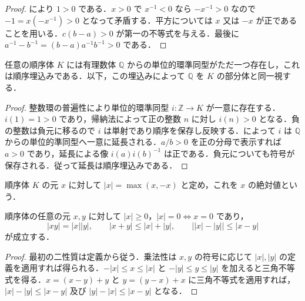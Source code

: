 \begin{proof}
により $1>0$ である．$x>0$ で $x^{-1}<0$ なら $-x^{-1}>0$ なので $-1=x(-x^{-1})>0$ となって矛盾する．平方については $x$ 又は $-x$ が正であることを用いる．$c(b-a)>0$ が第一の不等式を与える．最後に $a^{-1}-b^{-1}=(b-a)a^{-1}b^{-1}>0$ である．
\end{proof}
\begin{prop}[順序体への有理数体の標準埋込み]
任意の順序体 $K$ には有理数体 $\mathbb Q$ からの単位的環準同型がただ一つ存在し，これは順序埋込みである．以下，この埋込みによって $\mathbb Q$ を $K$ の部分体と同一視する．
\end{prop}
\begin{proof}
整数環の普遍性により単位的環準同型 $i:\mathbb Z\to K$ が一意に存在する．$i(1)=1>0$ であり，帰納法によって正の整数 $n$ に対し $i(n)>0$ となる．負の整数は負元に移るので $i$ は単射であり順序を保存し反映する．によって $i$ は $\mathbb Q$ からの単位的準同型へ一意に延長される．$a/b>0$ を正の分母で表示すれば $a>0$ であり，延長による像 $i(a)i(b)^{-1}$ は正である．負元についても符号が保存される．従って延長は順序埋込みである．
\end{proof}
\begin{defn}[順序体の絶対値]
順序体 $K$ の元 $x$ に対して $|x|=\max(x,-x)$ と定め，これを $x$ の絶対値という．
\end{defn}
\begin{prop}[順序体の絶対値の基本性質]
順序体の任意の元 $x,y$ に対して $|x|\geq0$，$|x|=0\Longleftrightarrow x=0$ であり，
\[
 |xy|=|x||y|,\qquad |x+y|\leq|x|+|y|,\qquad
 \bigl||x|-|y|\bigr|\leq|x-y|
\]
が成立する．
\end{prop}
\begin{proof}
最初の二性質は定義から従う．乗法性は $x,y$ の符号に応じて $|x|,|y|$ の定義を適用すれば得られる．$-|x|\leq x\leq|x|$ と $-|y|\leq y\leq|y|$ を加えると三角不等式を得る．$x=(x-y)+y$ と $y=(y-x)+x$ に三角不等式を適用すれば，$|x|-|y|\leq|x-y|$ 及び $|y|-|x|\leq|x-y|$ となる．
\end{proof}
